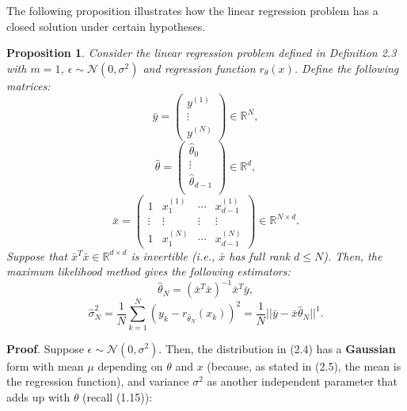 \documentclass{report}
\newtheorem{proposition}{Proposition}[chapter]
\begin{document}
The following proposition illustrates how the linear regression problem has a closed solution under certain hypotheses.
\begin{proposition}
Consider the linear regression problem defined in Definition 2.3 with $m=1$, $\epsilon \sim \mathcal{N}(0, \sigma^2)$ and regression function $r_\theta(x)$. Define the following matrices:
\begin{equation}
\bar{y}=\begin{pmatrix}y^{(1)}\\
\vdots\\
y^{(N)}
\end{pmatrix} \in \mathbb{R}^N,
\end{equation}
\begin{equation}
\hat{\theta} = \begin{pmatrix}\hat{\theta}_0\\
\vdots\\
\hat{\theta}_{d-1}\\
\end{pmatrix} \in \mathbb{R}^{d},
\end{equation}
\begin{equation}
\bar{x} = \begin{pmatrix}
1 & x^{(1)}_1 & \cdots & x^{(1)}_{d-1} \\
\vdots & \vdots  & \vdots & \vdots \\
1 & x^{(N)}_1  &\cdots & x^{(N)}_{d-1}
\end{pmatrix} \in \mathbb{R}^{N \times d}.
\end{equation}
Suppose that $\bar{x}^T\bar{x} \in \mathbb{R}^{d \times d}$ is invertible (i.e., $\bar{x}$ has full rank $d \leq N$).
Then, the maximum likelihood method gives the following estimators:
\begin{equation}
\hat{\theta}_N = (\bar{x}^T\bar{x})^{-1}\bar{x}^T\bar{y},
\end{equation}
\begin{equation}
\hat{\sigma}_N^2 = \frac{1}{N}\sum_{k=1}^{N}(y_k-r_{\hat{\theta}_N}(x_k))^2 = \frac{1}{N}||\bar{y} -\bar{x}\hat{\theta}_N||^1.
\end{equation}
\end{proposition}
\textbf{Proof}. Suppose $\epsilon \sim \mathcal{N}(0, \sigma^2)$. Then, the distribution in (2.4) has a \textbf{Gaussian} form with mean $\mu$ depending on $\theta$ and $x$ (because, as stated in (2.5), the mean is the regression function), and variance $\sigma^2$ as another independent parameter that adds up with $\theta$ (recall (1.15)):
\end{document}
